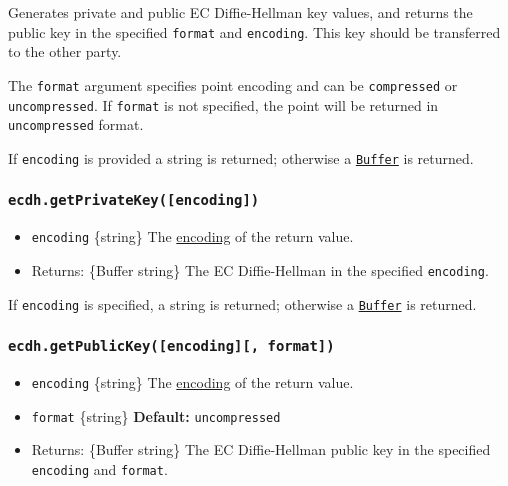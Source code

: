 Generates private and public EC Diffie-Hellman key values, and returns
the public key in the specified \texttt{format} and \texttt{encoding}.
This key should be transferred to the other party.

The \texttt{format} argument specifies point encoding and can be
\texttt{\textquotesingle{}compressed\textquotesingle{}} or
\texttt{\textquotesingle{}uncompressed\textquotesingle{}}. If
\texttt{format} is not specified, the point will be returned in
\texttt{\textquotesingle{}uncompressed\textquotesingle{}} format.

If \texttt{encoding} is provided a string is returned; otherwise a
\href{buffer.md}{\texttt{Buffer}} is returned.

\subsubsection{\texorpdfstring{\texttt{ecdh.getPrivateKey({[}encoding{]})}}{ecdh.getPrivateKey({[}encoding{]})}}\label{ecdh.getprivatekeyencoding}

\begin{itemize}
\tightlist
\item
  \texttt{encoding} \{string\} The
  \href{buffer.md\#buffers-and-character-encodings}{encoding} of the
  return value.
\item
  Returns: \{Buffer \textbar{} string\} The EC Diffie-Hellman in the
  specified \texttt{encoding}.
\end{itemize}

If \texttt{encoding} is specified, a string is returned; otherwise a
\href{buffer.md}{\texttt{Buffer}} is returned.

\subsubsection{\texorpdfstring{\texttt{ecdh.getPublicKey({[}encoding{]}{[},\ format{]})}}{ecdh.getPublicKey({[}encoding{]}{[}, format{]})}}\label{ecdh.getpublickeyencoding-format}

\begin{itemize}
\tightlist
\item
  \texttt{encoding} \{string\} The
  \href{buffer.md\#buffers-and-character-encodings}{encoding} of the
  return value.
\item
  \texttt{format} \{string\} \textbf{Default:}
  \texttt{\textquotesingle{}uncompressed\textquotesingle{}}
\item
  Returns: \{Buffer \textbar{} string\} The EC Diffie-Hellman public key
  in the specified \texttt{encoding} and \texttt{format}.
\end{itemize}

